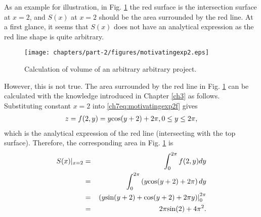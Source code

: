 As an example for illustration, in Fig. \ref{ch7fig:motivatingexp2} the red surface is the intersection surface at $x=2$, and $S(x)$ at $x=2$ should be the area surrounded by the red line. At a first glance, it seems that $S(x)$ does not have an analytical expression as the red line shape is quite arbitrary.

\begin{figure}
	\centering
	\texttt{[image: chapters/part-2/figures/motivatingexp2.eps]}
	\caption{Calculation of volume of an arbitrary arbitrary project.} \label{ch7fig:motivatingexp2}
\end{figure}

However, this is not true. The area surrounded by the red line in Fig. \ref{ch7fig:motivatingexp2} can be calculated with the knowledge introduced in Chapter \ref{ch3} as follows. Substituting constant $x=2$ into \eqref{ch7eq:motivatingexp2f} gives
\begin{eqnarray}
	z = f(2,y) = y\textup{cos}(y+2) + 2\pi, 0\leq y\leq2\pi, \nonumber
\end{eqnarray}
which is the analytical expression of the red line (intersecting with the top surface). Therefore, the corresponding area in Fig. \ref{ch7fig:motivatingexp2} is
\begin{eqnarray}
	S(x)|_{x=2} &=& \int_{0}^{2\pi} f(2,y) dy \nonumber \\ &=& \int_{0}^{2\pi}\left(y\textup{cos}(y+2) + 2\pi\right)dy \nonumber \\
	&=& \left.\left(y\textup{sin}(y+2)+\textup{cos}(y+2) + 2\pi y\right)\right|_{0}^{2\pi} \nonumber \\
	&=& 2\pi\textup{sin}(2) + 4\pi^2. \nonumber
\end{eqnarray}

